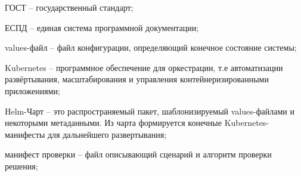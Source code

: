 \newpage
\begin{abbreviations}

ГОСТ -- государственный стандарт;

ЕСПД -- единая система программной документации;

values-файл -- файл конфигурации, определяющий конечное состояние системы;

Kubernetes -- программное обеспечение для оркестрации, т.е автоматизации развёртывания, масштабирования и управления контейнеризированными приложениями;

Helm-Чарт -- это распространяемый пакет, шаблонизируемый values-файлами и некоторыми метаданными. Из чарта формируется конечные Kubernetes-манифесты для дальнейшего развертывания;

манифест проверки -- файл описывающий сценарий и алгоритм проверки решения;

\end{abbreviations}